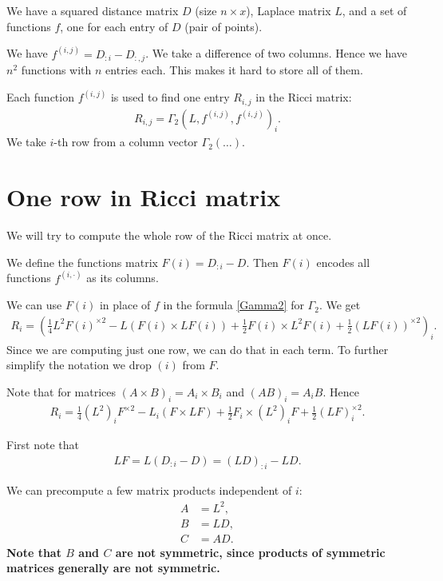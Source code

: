\documentclass[12pt]{amsart}
\begin{document}
We have a squared distance matrix $D$ (size $n\times x$), Laplace matrix $L$, and a set of functions $f$, one for each entry of $D$ (pair of points).

We have $f^{(i,j)}=D_{:i}-D_{:,j}$. We take a difference of two columns. Hence we have $n^2$ functions with $n$ entries each. This makes it hard to store all of them.

Each function $f^{(i,j)}$ is used to find one entry $R_{i,j}$ in the Ricci matrix:
\begin{align*}
    R_{i,j} = \Gamma_2(L, f^{(i,j)}, f^{(i,j)})_{i}.
\end{align*}
We take $i$-th row from a column vector $\Gamma_2(\ldots)$.
\section{One row in Ricci matrix}
\label{sec:RowInRicci}
We will try to compute the whole row of the Ricci matrix at once.

We define the functions matrix $F(i)=D_{:i}-D$.  Then $F(i)$ encodes all functions $f^{(i,\cdot)}$ as its columns.

We can use $F(i)$ in place of $f$ in the formula \eqref{Gamma2} for $\Gamma_2$. We get 
\begin{align*}
    R_{i} = \left(\frac{1}{4} L^2F(i)^{\times2}-L(F(i)\times LF(i))+\frac{1}{2}F(i)\times L^2F(i)+\frac{1}{2}(LF(i))^{\times2}\right)_{i}.
\end{align*}
Since we are computing just one row, we can do that in each term. To further simplify the notation we drop $(i)$ from $F$.

Note that for matrices $(A \times B)_i = A_i\times B_i$ and $(AB)_i = A_i B$. Hence
\begin{align}\label{RicciRow}
    R_{i} = \frac{1}{4} (L^2)_i F^{\times2}-L_i(F\times LF)+\frac{1}{2}F_i\times (L^2)_iF+\frac{1}{2}(LF)^{\times2}_i.
\end{align}

First note that
\begin{align*}
LF = L(D_{:i}-D)=(LD)_{:i}-LD.
\end{align*}

We can precompute a few matrix products independent of $i$:
\begin{align*}
    A&=L^2,\\
    B&=LD,\\
    C&=AD.
\end{align*}
\textbf{Note that $B$ and $C$ are not symmetric, since products of symmetric matrices generally are not symmetric.}
\end{document}
